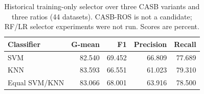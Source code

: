 \begin{table}[pos=!htbp]
\centering\small
\caption{Historical training-only selector over three CASB variants and three ratios (44 datasets). CASB-ROS is not a candidate; RF/LR selector experiments were not run. Scores are percent.}\label{tab:selector}
\begin{tabular}{lrrrr}\toprule
Classifier & G-mean & F1 & Precision & Recall \\
\midrule
SVM & 82.540 & 69.452 & 66.809 & 77.689 \\
KNN & 83.593 & 66.551 & 61.023 & 79.310 \\
Equal SVM/KNN & 83.066 & 68.001 & 63.916 & 78.500 \\
\bottomrule\end{tabular}
\end{table}
